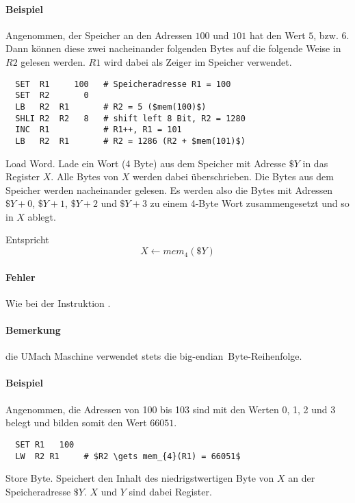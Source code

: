 \paragraph{Beispiel}
Angenommen, der Speicher an den Adressen $100$ und $101$ hat den Wert $5$, bzw.
$6$. Dann können diese zwei nacheinander folgenden Bytes auf die
folgende Weise in $R2$ gelesen werden. $R1$ wird dabei als Zeiger im Speicher
verwendet.
\begin{lstlisting}
  SET  R1     100   # Speicheradresse R1 = 100
  SET  R2       0
  LB   R2  R1       # R2 = 5 ($mem(100)$)
  SHLI R2  R2   8   # shift left 8 Bit, R2 = 1280
  INC  R1           # R1++, R1 = 101
  LB   R2  R1       # R2 = 1286 (R2 + $mem(101)$)
\end{lstlisting}




\glqq Load Word\grqq.
Lade ein Wort (4 Byte) aus dem Speicher mit Adresse $\$Y$ in das Register $X$.
Alle Bytes von $X$ werden dabei überschrieben. Die Bytes aus dem Speicher werden
nacheinander gelesen. Es werden also die Bytes mit Adressen $\$Y + 0$, $\$Y +
1$, $\$Y + 2$ und $\$Y + 3$ zu einem 4-Byte Wort zusammengesetzt und so in $X$
ablegt.

Entspricht 
\[
  X \gets mem_{4}(\$Y)
\]

\paragraph{Fehler}
Wie bei der Instruktion .


\paragraph{Bemerkung}
die UMach Maschine verwendet stets die \glqq big-endian\grqq\ Byte-Reihenfolge.


\paragraph{Beispiel}
Angenommen, die Adressen von 100 bis 103 sind mit den Werten 0, 1, 2 und 3
belegt und bilden somit den Wert $66051$.
\begin{lstlisting}
  SET R1   100
  LW  R2 R1     # $R2 \gets mem_{4}(R1) = 66051$
\end{lstlisting}




\glqq Store Byte\grqq.
Speichert den Inhalt des niedrigstwertigen Byte von $X$ an der Speicheradresse
$\$Y$. $X$ und $Y$ sind dabei Register.

